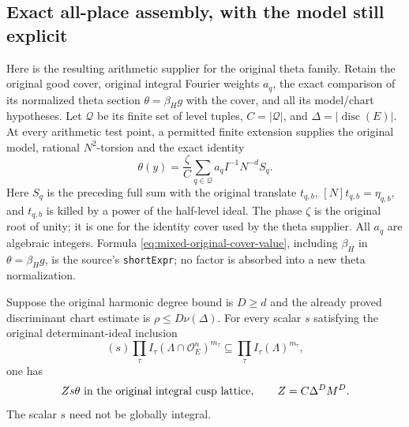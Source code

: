 \subsection*{Exact all-place assembly, with the model still explicit}

Here is the resulting arithmetic supplier for the original theta
family.  Retain the original good cover, original integral Fourier
weights $a_q$, the exact comparison of its normalized theta section
$\theta=\beta_H g$ with the cover, and all its model/chart hypotheses.
Let $\mathcal Q$ be its finite set of level tuples, $C=|\mathcal Q|$,
and $\Delta=|\operatorname{disc}(E)|$.  At every arithmetic test point,
a permitted finite extension supplies the original model, rational
$N^2$-torsion and the exact identity
\begin{equation}\label{eq:mixed-original-cover-value}
 \theta(y)=\frac{\zeta}{C}
       \sum_{q\in\mathcal Q}a_q I^{-1}N^{-d} S_q.
\end{equation}
Here $S_q$ is the preceding full sum with the original translate
$t_{q,b}$, $[N]t_{q,b}=\eta_{q,b}$, and $t_{q,b}$ is killed by a
power of the half-level ideal.  The phase $\zeta$ is the original
root of unity; it is one for the identity cover used by the theta
supplier.  All $a_q$ are algebraic integers.  Formula
\eqref{eq:mixed-original-cover-value}, including $\beta_H$ in
$\theta=\beta_Hg$, is the source's \texttt{shortExpr}; no factor is
absorbed into a new theta normalization.

Suppose the original harmonic degree bound is $D\geq d$ and the
already proved discriminant chart estimate is
$\rho\leq D\nu(\Delta)$.  For every scalar $s$ satisfying the
original determinant-ideal inclusion
\begin{equation}\label{eq:mixed-clearing-ideal}
 (s)\prod_\tau I_\tau(\Lambda\cap\mathcal O_E^n)^{m_\tau}
       \subseteq\prod_\tau I_\tau(\Lambda)^{m_\tau},
\end{equation}
one has
\begin{equation}\label{eq:mixed-single-clearing-integer}
       Zs\theta\ \hbox{in the original integral cusp lattice},
       \qquad Z=C\Delta^D M^D.
\end{equation}
The scalar $s$ need not be globally integral.


